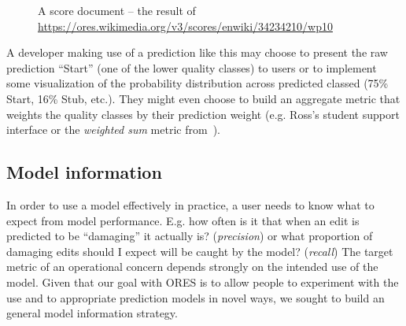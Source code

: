 \begin{figure}[h!]
        \caption{A score document -- the result of \url{https://ores.wikimedia.org/v3/scores/enwiki/34234210/wp10}}
        \label{fig:english_wp10_prediction}
\end{figure}

A developer making use of a prediction like this may choose to present the raw prediction ``Start'' (one of the lower quality classes) to users or to implement some visualization of the probability distribution across predicted classed (75\% Start, 16\% Stub, etc.).  They might even choose to build an aggregate metric that weights the quality classes by their prediction weight (e.g. Ross's student support interface\cite{ross2016visualizing} or the \emph{weighted sum} metric from~\cite{halfaker2017interpolating}).

\subsection{Model information}
\label{sec:appendix.model_information}
In order to use a model effectively in practice, a user needs to know what to expect from model performance.  E.g. how often is it that when an edit is predicted to be ``damaging'' it actually is? (\emph{precision}) or what proportion of damaging edits should I expect will be caught by the model? (\emph{recall})  The target metric of an operational concern depends strongly on the intended use of the model.  Given that our goal with ORES is to allow people to experiment with the use and to appropriate prediction models in novel ways, we sought to build an general model information strategy.

